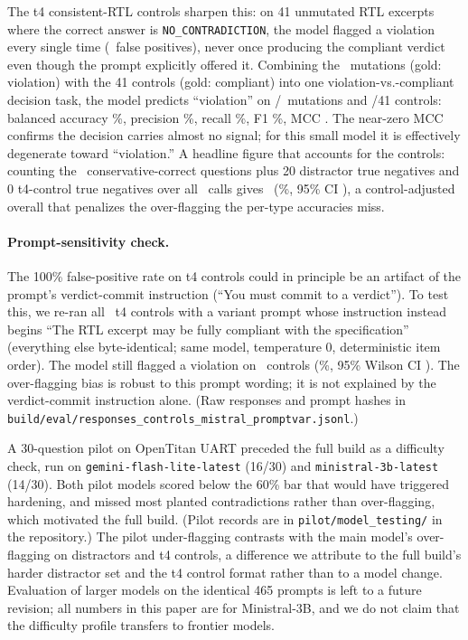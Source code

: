 \documentclass[11pt]{article}
\begin{document}
The t4 consistent-RTL controls sharpen this: on 41 unmutated RTL excerpts where the correct answer is \texttt{NO\_CONTRADICTION}, the model flagged a violation every single time (\CtrlFPR\ false positives), never once producing the compliant verdict even though the prompt explicitly offered it. Combining the \NTfour\ mutations (gold: violation) with the 41 controls (gold: compliant) into one violation-vs.-compliant decision task, the model predicts ``violation'' on \DecTP/\NTfour\ mutations and \DecFP/41 controls: balanced accuracy \DecBalAcc\%, precision \DecPrec\%, recall \DecRec\%, F1 \DecFone\%, MCC \DecMCC. The near-zero MCC confirms the decision carries almost no signal; for this small model it is effectively degenerate toward ``violation.'' A headline figure that accounts for the controls: counting the \ConsToverall\ conservative-correct questions plus 20 distractor true negatives and 0 t4-control true negatives over all \NCalls\ calls gives \ConsWithControls\ (\ConsAccWithControls\%, 95\% CI \ConsCIWithControls), a control-adjusted overall that penalizes the over-flagging the per-type accuracies miss.

\paragraph{Prompt-sensitivity check.} The 100\% false-positive rate on t4 controls could in principle be an artifact of the prompt's verdict-commit instruction (``You must commit to a verdict''). To test this, we re-ran all \PromptVarN\ t4 controls with a variant prompt whose instruction instead begins ``The RTL excerpt may be fully compliant with the specification'' (everything else byte-identical; same model, temperature 0, deterministic item order). The model still flagged a violation on \PromptVarFP\ controls (\PromptVarFPR\%, 95\% Wilson CI \PromptVarCIFPR). The over-flagging bias is robust to this prompt wording; it is not explained by the verdict-commit instruction alone. (Raw responses and prompt hashes in \texttt{build/eval/responses\_controls\_mistral\_promptvar.jsonl}.)

A 30-question pilot on OpenTitan UART preceded the full build as a difficulty check, run on \texttt{gemini-flash-lite-latest} (16/30) and \texttt{ministral-3b-latest} (14/30). Both pilot models scored below the 60\% bar that would have triggered hardening, and missed most planted contradictions rather than over-flagging, which motivated the full build. (Pilot records are in \texttt{pilot/model\_testing/} in the repository.) The pilot under-flagging contrasts with the main model's over-flagging on distractors and t4 controls, a difference we attribute to the full build's harder distractor set and the t4 control format rather than to a model change. Evaluation of larger models on the identical 465 prompts is left to a future revision; all numbers in this paper are for Ministral-3B, and we do not claim that the difficulty profile transfers to frontier models.
\end{document}
